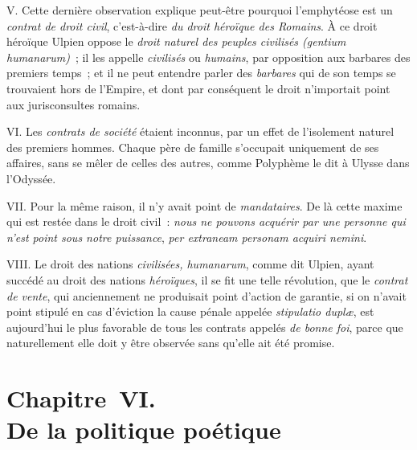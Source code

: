 \documentclass[french,twoside]{book} %
\newcommand\chapteropen{} %
\newcommand\chaptercont{} %
\newcommand\chapterclose{} %
\begin{document}
V. Cette dernière observation explique peut-être pourquoi l’emphytéose est un {\itshape contrat de droit civil}, c’est-à-dire {\itshape du droit héroïque des Romains}. À ce droit héroïque Ulpien oppose le \emph{{\itshape droit naturel des peuples civilisés} ({\itshape gentium humanarum})} ; il les appelle {\itshape civilisés} ou {\itshape humains}, par opposition aux barbares des premiers temps ; et il ne peut entendre parler des {\itshape barbares} qui de son temps se trouvaient hors de l’Empire, et dont par conséquent le droit n’importait point aux jurisconsultes romains.\par
VI. Les {\itshape contrats de société} étaient inconnus, par un effet de l’isolement naturel des premiers hommes. Chaque père de famille s’occupait uniquement de ses affaires, sans se mêler de celles des autres, comme Polyphème le dit à Ulysse dans l’Odyssée.\par
 VII. Pour la même raison, il n’y avait point de {\itshape mandataires}. De là cette maxime qui est restée dans le droit civil : {\itshape nous ne pouvons acquérir par une personne qui n’est point sous notre puissance}, \emph{{\itshape per extraneam personam acquiri nemini}}.\par
VIII. Le droit des nations {\itshape civilisées, humanarum}, comme dit Ulpien, ayant succédé au droit des nations {\itshape héroïques}, il se fit une telle révolution, que le {\itshape contrat de vente}, qui anciennement ne produisait point d’action de garantie, si on n’avait point stipulé en cas d’éviction la cause pénale appelée {\itshape stipulatio duplæ}, est aujourd’hui le plus favorable de tous les contrats appelés {\itshape de bonne foi}, parce que naturellement elle doit y être observée sans qu’elle ait été promise.
\chapterclose


\chapteropen
\chapter[{Chapitre VI. De la politique poétique}]{Chapitre VI. \\
De la politique poétique}

\chaptercont
\end{document}

